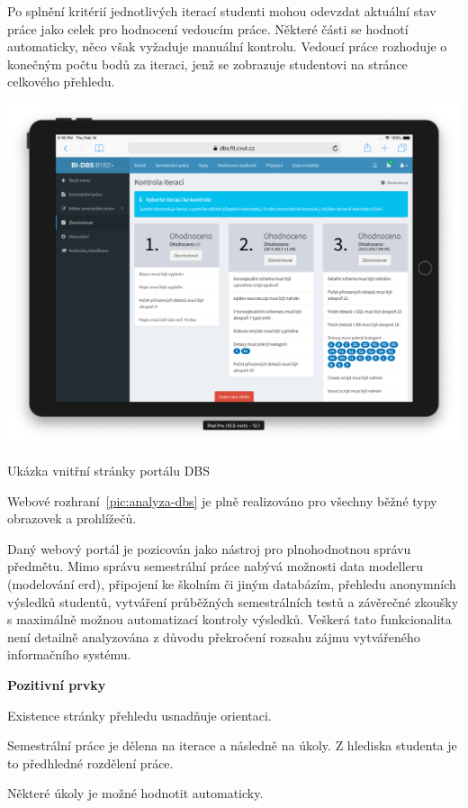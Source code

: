 Po splnění kritérií jednotlivých iterací studenti mohou odevzdat aktuální stav práce jako celek pro hodnocení vedoucím práce. Některé části se hodnotí automaticky, něco však vyžaduje manuální kontrolu. Vedoucí práce rozhoduje o konečným počtu bodů za iteraci, jenž se zobrazuje studentovi na stránce celkového přehledu.

\begin{fig:illustration}
   \includegraphics[width=1\textwidth]{images/analyza-dbs.png}
   \caption{Ukázka vnitřní stránky portálu DBS}\label{pic:analyza-dbs}
\end{fig:illustration}


Webové rozhraní~\ref{pic:analyza-dbs} je plně realizováno pro všechny běžné typy obrazovek a prohlížečů.

Daný webový portál je pozicován jako nástroj pro plnohodnotnou správu předmětu. Mimo správu semestrální práce nabývá možnosti data modelleru (modelování \gls{erd}), připojení ke školním či jiným databázím, přehledu anonymních výsledků studentů, vytváření průběžných semestrálních testů a závěrečné zkoušky s maximálně možnou automatizací kontroly výsledků. Veškerá tato funkcionalita není detailně analyzována z důvodu překročení rozsahu zájmu vytvářeného informačního systému.

\textbf{Pozitivní prvky}

\begin{ul}
   \item
   Existence stránky přehledu usnadňuje orientaci.
   \item
   Semestrální práce je dělena na iterace a následně na úkoly. Z hlediska studenta je to předhledné rozdělení práce.
   \item
   Některé úkoly je možné hodnotit automaticky.
\end{ul}

